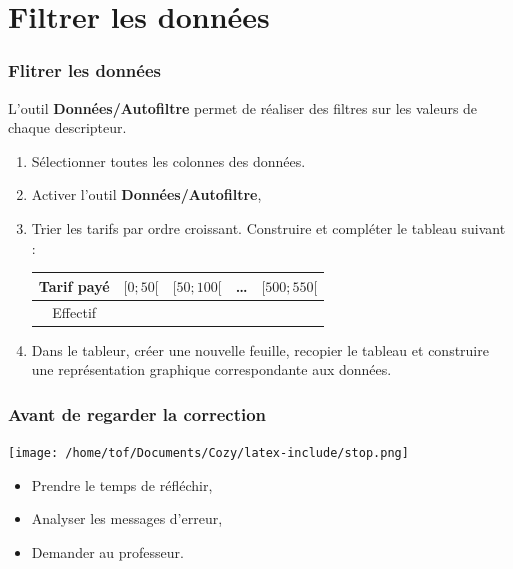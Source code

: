 \documentclass[svgnames,11pt]{beamer}
\begin{document}
\section{Filtrer les données}
\begin{frame}
    \frametitle{Flitrer les données}

    L’outil \textbf{Données/Autofiltre} permet de réaliser des filtres sur les valeurs de chaque descripteur.
    \begin{activite}
    \begin{enumerate}
        \item Sélectionner toutes les colonnes des données.
        \item  Activer l'outil \textbf{Données/Autofiltre},
        \item Trier les tarifs par ordre croissant. Construire et compléter le tableau suivant :
        \begin{center}
            \begin{tabular}{|*{5}{c|}}
                \hline
                Tarif payé & $[0;50[$& $[50;100[$& \dots& $[500;550[$\\
                \hline
                Effectif&&&&\\
                \hline
            \end{tabular}
        \end{center}
        \item Dans le tableur, créer une nouvelle feuille, recopier le tableau et construire une représentation graphique correspondante aux données.
    \end{enumerate}
    \end{activite}

\end{frame}
\begin{frame}
    \frametitle{Avant de regarder la correction}
\begin{center}
    \centering
    \texttt{[image: /home/tof/Documents/Cozy/latex-include/stop.png]}
    \end{center}
{\Large
    \begin{itemize}
        \item Prendre le temps de réfléchir,
        \item Analyser les messages d'erreur,
        \item Demander au professeur.
    \end{itemize}
}
\end{frame}
\end{document}
